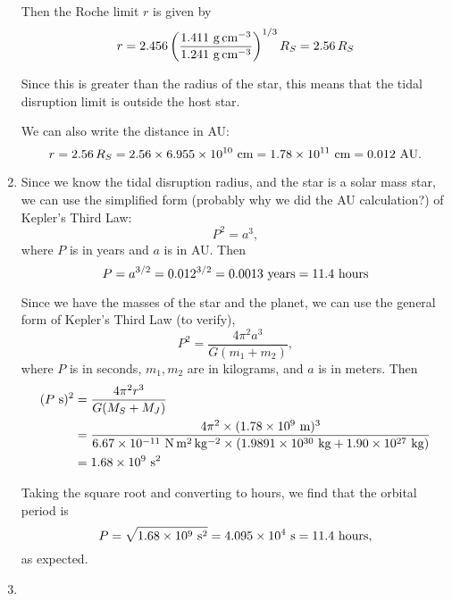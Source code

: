 \documentclass[11pt,letterpaper]{article}
\begin{document}
\begin{enumerate}[label=(\alph*)]
        Then the Roche limit $r$ is given by 
        \begin{equation*}
            r = 2.456\left(\frac{1.411~{\rm g\,cm^{-3}}}{1.241~{\rm g\,cm^{-3}}}\right)^{1/3} R_S = 2.56\,R_S
        \end{equation*}

        Since this is greater than the radius of the star, this means that the tidal disruption limit is outside the host star.

        We can also write the distance in AU:
        \begin{equation*}
            r = 2.56\,R_S = 2.56\times 6.955\times 10^{10}~{\rm cm} = 1.78\times 10^{11}~{\rm cm} = 0.012~{\rm AU}.
        \end{equation*}

    \item Since we know the tidal disruption radius, and the star is a solar mass star, we can use the simplified form (probably why we did the AU calculation?) of Kepler's Third Law:
        \begin{equation*}
            P^2 = a^3,
        \end{equation*}
        where $P$ is in years and $a$ is in AU. Then 
        \begin{equation*}
            P= a^{3/2} = 0.012^{3/2} = 0.0013~{\rm years} = 11.4~{\rm hours}
        \end{equation*}

        Since we have the masses of the star and the planet, we can use the general form of Kepler's Third Law (to verify),
        \begin{equation*}
            P^2 = \frac{4\pi^2 a^3}{G(m_1+m_2)},
        \end{equation*}
        where $P$ is in seconds, $m_1, m_2$ are in kilograms, and $a$ is in meters. Then
        \begin{align*}
            (P~{\rm s})^2 &= \frac{4\pi^2 r^3}{G(M_S+M_J)} \\
                            &= \frac{4\pi^2\times (1.78\times 10^{9}~{\rm m})^3}{6.67\times 10^{-11}~{\rm N\,m^2\,kg^{-2}} \times (1.9891\times 10^{30}~{\rm kg} + 1.90\times 10^{27}~{\rm kg})} \\
                              &= 1.68\times 10^{9}~{\rm s}^2
        \end{align*}

        Taking the square root and converting to hours, we find that the orbital period is
        \begin{equation*}
            P = \sqrt{1.68\times 10^{9}~{\rm s}^2} = 4.095\times 10^{4}~{\rm s} = 11.4~{\rm hours},
        \end{equation*}
        as expected.

    \item 

\end{enumerate}
\end{document}
